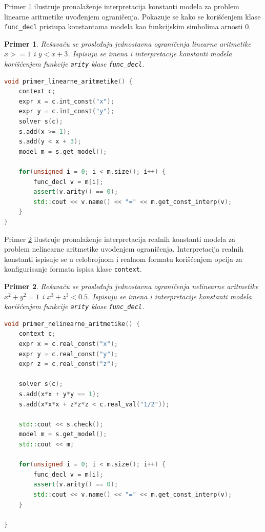 \documentclass[12pt,oneside]{memoir}
\newtheorem{primer}{Primer}
\begin{document}
Primer \ref{ex4} ilustruje pronalaženje interpretacija konstanti modela za problem linearne aritmetike uvođenjem ograničenja.
Pokazuje se kako se korišćenjem klase \texttt{func\_decl} pristupa konstantama modela kao funkcijskim simbolima arnosti 0.
\begin{primer} \label{ex4}
Rešavaču se prosleđuju jednostavna ograničenja linearne aritmetike $x >= 1$  i $y < x + 3$. Ispisuju se imena i interpretacije konstanti modela korišćenjem
funkcije \texttt{arity} klase \texttt{func\_decl}.
\\
\begin{lstlisting}[language=C++]
void primer_linearne_aritmetike() {
    context c;
    expr x = c.int_const("x");
    expr y = c.int_const("y");
    solver s(c);
    s.add(x >= 1);
    s.add(y < x + 3);
    model m = s.get_model();

    for(unsigned i = 0; i < m.size(); i++) {
        func_decl v = m[i];
        assert(v.arity() == 0); 
        std::cout << v.name() << "=" << m.get_const_interp(v);
    }
}
\end{lstlisting}
\end{primer}

Primer \ref{ex5} ilustruje pronalaženje interpretacija realnih konstanti modela za problem nelinearne aritmetike uvođenjem ograničenja. Interpretacija realnih konstanti ispisuje se u celobrojnom i realnom formatu korišćenjem opcija za konfigurisanje formata ispisa klase \texttt{context}. 

\begin{primer} \label{ex5}
Rešavaču se prosleđuju jednostavna ograničenja nelinearne aritmetike 
$x^2 + y^2 = 1$ i $x^3 + z^3 < 0.5$. Ispisuju se imena i interpretacije konstanti modela korišćenjem funkcije \texttt{arity} klase \texttt{func\_decl}.
\\
\begin{lstlisting}[language=C++]
void primer_nelinearne_aritmetike() {    
    context c;
    expr x = c.real_const("x");
    expr y = c.real_const("y");
    expr z = c.real_const("z");
                     
    solver s(c);
    s.add(x*x + y*y == 1);                    
    s.add(x*x*x + z*z*z < c.real_val("1/2"));  
    
    std::cout << s.check();
    model m = s.get_model();
    std::cout << m;
    
    for(unsigned i = 0; i < m.size(); i++) {
        func_decl v = m[i];
        assert(v.arity() == 0); 
        std::cout << v.name() << "=" << m.get_const_interp(v);
    }

}
\end{lstlisting}
\end{primer}
\end{document}

